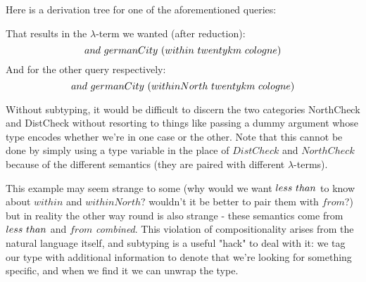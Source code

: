 \documentclass[main.tex]{subfiles}
\begin{document}
\begin{example}
    Here is a derivation tree for one of the aforementioned queries:

    That results in the $\lambda$-term we wanted (after reduction):
    \[ and \text{ } germanCity \text{ } (within \text{ } twentykm \text{ } cologne) \]
    And for the other query respectively:
    \[ and \text{ } germanCity \text{ } (withinNorth \text{ } twentykm \text{ } cologne) \]

    Without subtyping, it would be difficult to discern the two categories
    NorthCheck and DistCheck without resorting to things like passing a
    dummy argument whose type encodes whether we're in one case or the other.
    Note that this cannot be done by simply using a type variable in the place
    of $DistCheck$ and $NorthCheck$ because of the different semantics
    (they are paired with different $\lambda$-terms).

    This example may seem strange to some (why would
    we want $less \text{ } than$ to know about $within$ and $withinNorth$?
    wouldn't it be better to pair them with $from$?) but in reality the
    other way round is also strange - these semantics come from $less \text{ } than$
    and $from$ \emph{combined}. This violation of compositionality arises
    from the natural language itself, and subtyping is a useful "hack" to
    deal with it: we tag our type with additional information to denote that
    we're looking for something specific, and when we find it we can unwrap the
    type.
\end{example}
\end{document}
